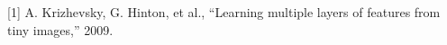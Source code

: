 [1] A. Krizhevsky, G. Hinton, et al., “Learning multiple layers of features
from tiny images,” 2009.